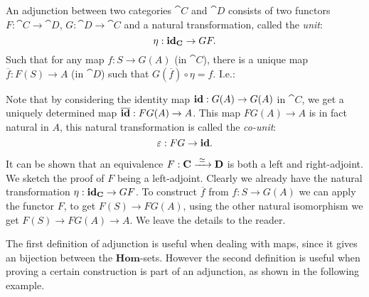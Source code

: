 \begin{definition}
	An adjunction between two categories $\cat{C}$ and $\cat{D}$ consists of two functors $F:\cat{C} \to \cat{D}$, $G: \cat{D} \to \cat{C}$ and a natural transformation, called the \emph{unit}:
	$$ \eta : \mathbf{id}_{\mathbf{C}} \to GF. $$
	Such that for any map $f: S \to G(A)$ (in $\cat{C}$), there is a unique map $\overline{f}: F(S) \to A$ (in $\cat{D}$) such that $G(\overline{f}) \circ \eta = f$. I.e.:
\begin{center}
\end{center}
\end{definition}

Note that by considering the identity map $\mathbf{id} : G(A) \to G(A)$ in $\cat{C}$, we get a uniquely determined map $\overline{\mathbf{id}}:FG(A) \to A$. This map $FG(A) \to A$ is in fact natural in $A$, this natural transformation is called the \emph{co-unit}:
$$ \varepsilon: FG \to \mathbf{id}. $$

It can be shown that an equivalence $F: \mathbf{C} \xrightarrow{\,\,{\simeq}\,\,} \mathbf{D}$ is both a left and right-adjoint. We sketch the proof of $F$ being a left-adjoint. Clearly we already have the natural transformation $\eta: \mathbf{id}_{\mathbf{C}} \to GF$. To construct $\overline{f}$ from $f: S \to G(A)$ we can apply the functor $F$, to get $F(S) \to FG(A)$, using the other natural isomorphism we get $F(S) \to FG(A) \to A$. We leave the details to the reader.

The first definition of adjunction is useful when dealing with maps, since it gives an bijection between the $\mathbf{Hom}$-sets. However the second definition is useful when proving a certain construction is part of an adjunction, as shown in the following example.

